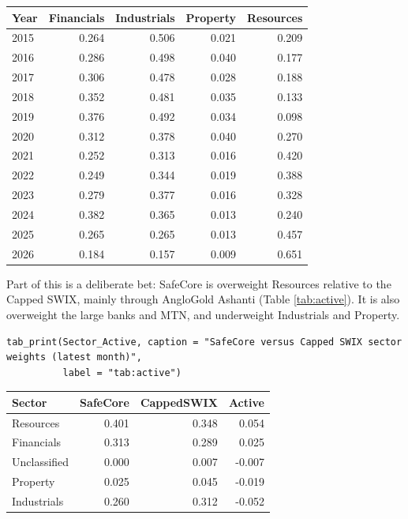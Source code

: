 \documentclass[11pt,preprint]{elsarticle}
\let\origtable\table
\let\endorigtable\endtable
\renewenvironment{table}[1][2] {
    \expandafter\origtable\expandafter[H]
} {
    \endorigtable
}
\numberwithin{equation}{section}
\numberwithin{figure}{section}
\numberwithin{table}{section}
\begin{document}
\begin{table}[!htbp]
\centering
\caption{Contribution to volatility by sector and year} 
\label{tab:yearrisk}
\begingroup\scriptsize
\begin{tabular}{lrrrr}
  \hline
Year & Financials & Industrials & Property & Resources \\ 
  \hline
2015 & 0.264 & 0.506 & 0.021 & 0.209 \\ 
  2016 & 0.286 & 0.498 & 0.040 & 0.177 \\ 
  2017 & 0.306 & 0.478 & 0.028 & 0.188 \\ 
  2018 & 0.352 & 0.481 & 0.035 & 0.133 \\ 
  2019 & 0.376 & 0.492 & 0.034 & 0.098 \\ 
  2020 & 0.312 & 0.378 & 0.040 & 0.270 \\ 
  2021 & 0.252 & 0.313 & 0.016 & 0.420 \\ 
  2022 & 0.249 & 0.344 & 0.019 & 0.388 \\ 
  2023 & 0.279 & 0.377 & 0.016 & 0.328 \\ 
  2024 & 0.382 & 0.365 & 0.013 & 0.240 \\ 
  2025 & 0.265 & 0.265 & 0.013 & 0.457 \\ 
  2026 & 0.184 & 0.157 & 0.009 & 0.651 \\ 
   \hline
\end{tabular}
\endgroup
\end{table}

Part of this is a deliberate bet: SafeCore is overweight Resources
relative to the Capped SWIX, mainly through AngloGold Ashanti (Table
\ref{tab:active}). It is also overweight the large banks and MTN, and
underweight Industrials and Property.

\begin{verbatim}
tab_print(Sector_Active, caption = "SafeCore versus Capped SWIX sector weights (latest month)",
          label = "tab:active")
\end{verbatim}

\begin{table}[!htbp]
\centering
\caption{SafeCore versus Capped SWIX sector weights (latest month)} 
\label{tab:active}
\begingroup\footnotesize
\begin{tabular}{lrrr}
  \hline
Sector & SafeCore & CappedSWIX & Active \\ 
  \hline
Resources & 0.401 & 0.348 & 0.054 \\ 
  Financials & 0.313 & 0.289 & 0.025 \\ 
  Unclassified & 0.000 & 0.007 & -0.007 \\ 
  Property & 0.025 & 0.045 & -0.019 \\ 
  Industrials & 0.260 & 0.312 & -0.052 \\ 
   \hline
\end{tabular}
\endgroup
\end{table}
\end{document}
